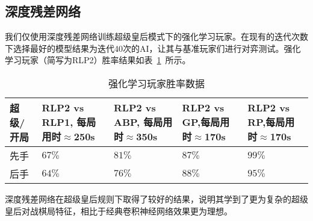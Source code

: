 \subsection{深度残差网络}
我们仅使用深度残差网络训练超级皇后模式下的强化学习玩家。在现有的迭代次数下选择最好的模型结果为迭代40次的AI，让其与基准玩家们进行对弈测试。强化学习玩家（简写为RLP2）胜率结果如表~\ref{table:airesult2}~所示。
\begin{table}[H]
    \centering
    \caption[airesult2]{强化学习玩家胜率数据}
    \begin{tabular}{p{2cm}<{\centering} p{3cm}<{\centering} p{3cm}<{\centering} p{3cm}<{\centering} p{3cm}<{\centering}}
    \hline
    超级/开局 & RLP2 vs RLP1, 每局用时$\approx$250s & RLP2 vs ABP, 每局用时$\approx$350s & RLP2 vs GP,每局用时$\approx$170s & RLP2 vs RP,每局用时$\approx$170s \\ \hline
    先手 & $67\%$ & $81\%$ & $87\%$ & $99\%$\\ 
    后手 & $64\%$ & $76\%$ & $88\%$ & $95\%$\\ \hline
    \end{tabular}
    \label{table:airesult2}
  \end{table}

深度残差网络在超级皇后规则下取得了较好的结果，说明其学到了更为复杂的超级皇后对战棋局特征，相比于经典卷积神经网络效果更为理想。

